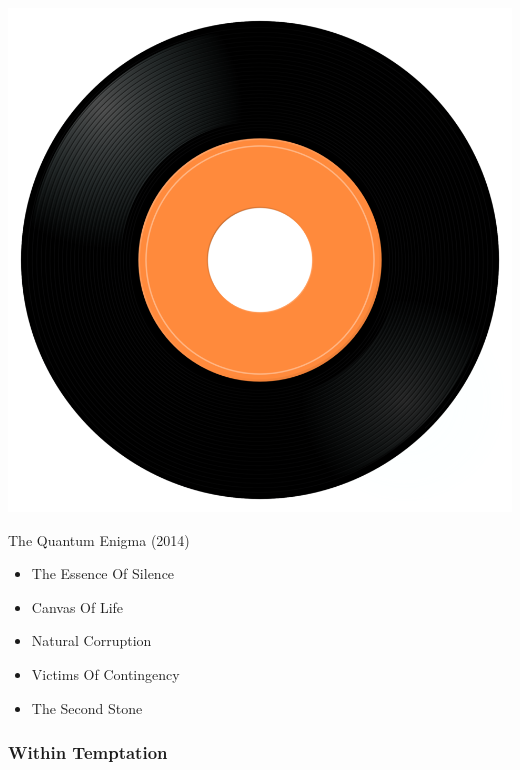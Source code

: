 \begin{minipage}[t]{0.25\textwidth}
\captionsetup{type=figure}
\includegraphics[width=\textwidth]{Images/cover.png}
\caption*{The Quantum Enigma (2014)}
\end{minipage}
\begin{minipage}[t]{0.25\textwidth}\vspace{0pt}
\begin{itemize}[nosep,leftmargin=1em,labelwidth=*,align=left]
	\setlength{\itemsep}{0pt}
	\item The Essence Of Silence
	\item Canvas Of Life
	\item Natural Corruption
	\item Victims Of Contingency
	\item The Second Stone
\end{itemize}
\end{minipage}

\subsubsection{Within Temptation}

